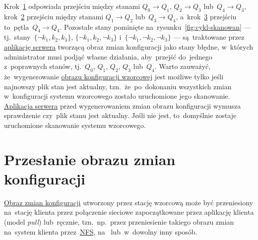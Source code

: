 \documentclass[thesis]{subfiles}
\begin{document}
Krok~\hyperlink{itm:pierwsze-skanowanie}{1} odpowiada przejściu między stanami $Q_0\rightarrow Q_1$, $Q_2\rightarrow Q_3$ lub~$Q_4\rightarrow Q_3$, krok~\hyperlink{itm:dokonanie-zmian}{2} przejściu między stanami $Q_1\rightarrow Q_2$ lub~$Q_3\rightarrow Q_4$, a~krok~\hyperlink{itm:dokonanie-zmian}{3} przejściu to~pętla~$Q_4\rightarrow Q_4$. Pozostałe stany pominięte na~rysunku~\ref{fig:cykl-skanowan} --- tj.~stany~$\{\neg k_1,k_2,k_3\}$, $\{\neg k_1,k_2,\neg k_3\}$ i~$\{\neg k_1,\neg k_2,\neg k_3\}$ --- są~traktowane przez \hyperref[sec:srv-app]{aplikację serwera} tworzącą obraz zmian konfiguracji jako stany błędne, w~których administrator musi podjąć własne działania, aby~przejść do~jednego z~poprawnych stanów, tj.~$Q_0$, $Q_1$, $Q_2$, $Q_3$ lub~$Q_4$. Warto zauważyć, że~wygenerowanie \hyperref[sec:obraz-zmian-konfiguracji]{obrazu konfiguracji wzorcowej} jest możliwe tylko jeśli najnowszy plik stan jest aktualny, tzn.~że~po~dokonaniu wszystkich zmian w~konfiguracji systemu wzorcowego zostało uruchomione jego skanowanie. \hyperref[sec:srv-app]{Aplikacja serwera} przed wygenerowaniem zmian obrazu konfiguracji wymusza sprawdzenie czy~plik stanu jest aktualny. Jeśli nie jest, to~domyślnie zostaje uruchomione skanowanie systemu wzorcowego.


\section{Przesłanie obrazu zmian konfiguracji}
\label{sec:przeslanie-obrazu-konfiguracji}

\hyperref[sec:obraz-zmian-konfiguracji]{Obraz zmian konfiguracji} utworzony przez stację wzorcową może być przeniesiony na~stację klienta przez połączenie sieciowe zapoczątkowane przez aplikację klienta (model \emph{pull}) lub~ręcznie, tzn.~np.~przez przeniesienie takiego obrazu zmian na~system klienta przez~\href{https://en.wikipedia.org/wiki/Network_File_System}{NFS}, na~ lub~w~dowolny inny sposób.
\end{document}
